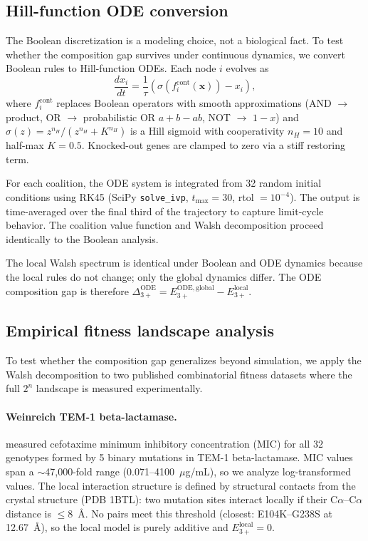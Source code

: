 \documentclass[10pt]{article}
\begin{document}
\subsection{Hill-function ODE conversion}
\label{sec:ode-method}

The Boolean discretization is a modeling choice, not a biological
fact. To test whether the composition gap survives under continuous
dynamics, we convert Boolean rules to Hill-function ODEs. Each node
$i$ evolves as
\begin{equation}
  \frac{dx_i}{dt} = \frac{1}{\tau}
  \left( \sigma\!\left(f_i^{\mathrm{cont}}(\mathbf{x})\right) - x_i \right),
\end{equation}
where $f_i^{\mathrm{cont}}$ replaces Boolean operators with smooth
approximations (AND $\to$ product, OR $\to$ probabilistic OR
$a + b - ab$, NOT $\to$ $1 - x$) and $\sigma(z) = z^{n_H} / (z^{n_H} + K^{n_H})$
is a Hill sigmoid with cooperativity $n_H = 10$ and half-max $K = 0.5$.
Knocked-out genes are clamped to zero via a stiff restoring term.

For each coalition, the ODE system is integrated from 32 random
initial conditions using RK45 (SciPy \texttt{solve\_ivp},
$t_{\max} = 30$, rtol $= 10^{-4}$). The output is time-averaged
over the final third of the trajectory to capture limit-cycle
behavior. The coalition value function and Walsh decomposition
proceed identically to the Boolean analysis.

The local Walsh spectrum is identical under Boolean and ODE dynamics
because the local rules do not change; only the global dynamics
differ. The ODE composition gap is therefore
$\Delta_{3+}^{\mathrm{ODE}} = E_{3+}^{\mathrm{ODE,global}} - E_{3+}^{\mathrm{local}}$.


\subsection{Empirical fitness landscape analysis}
\label{sec:empirical-method}

To test whether the composition gap generalizes beyond simulation,
we apply the Walsh decomposition to two published combinatorial
fitness datasets where the full $2^n$ landscape is measured
experimentally.

\paragraph{Weinreich TEM-1 beta-lactamase.}
\citet{weinreich2006darwinian} measured cefotaxime minimum
inhibitory concentration (MIC) for all 32 genotypes formed by 5
binary mutations in TEM-1 beta-lactamase. MIC values span a
$\sim$47{,}000-fold range (0.071--4100~$\mu$g/mL), so we analyze
log-transformed values. The local interaction structure is defined
by structural contacts from the crystal structure (PDB 1BTL): two
mutation sites interact locally if their C$\alpha$--C$\alpha$
distance is $\leq 8$~\AA. No pairs meet this threshold (closest:
E104K--G238S at 12.67~\AA), so the local model is purely additive
and $E_{3+}^{\mathrm{local}} = 0$.
\end{document}
